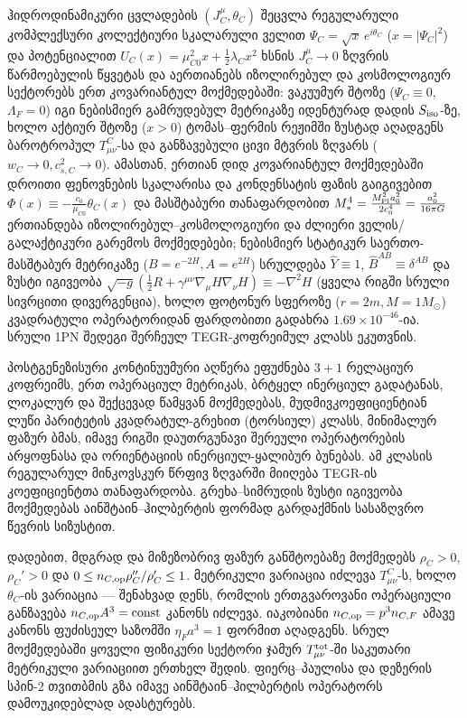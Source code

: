 \documentclass[11pt,a4paper]{article}
\begin{document}
\begin{enumerate}[label=\arabic*.]
ჰიდროდინამიკური ცვლადების $(J_C^\mu, \theta_C)$ შეცვლა რეგულარული კომპლექსური კოლექტიური სკალარული ველით $\Psi_C = \sqrt{x}\,e^{i\theta_C}$ ($x=|\Psi_C|^2$) და პოტენციალით $U_C(x) = \mu_{C0}^2 x + \frac{1}{2}\lambda_C x^2$ ხსნის $J_C^\mu \to 0$ ზღვრის წარმოებულის წყვეტას და აერთიანებს იზოლირებულ და კოსმოლოგიურ სექტორებს ერთ კოვარიანტულ მოქმედებაში: ვაკუუმურ შტოზე ($\Psi_C \equiv 0$, $\Lambda_F = 0$) იგი ნებისმიერ გამრუდებულ მეტრიკაზე იდენტურად დადის $S_{\rm iso}$-ზე, ხოლო აქტიურ შტოზე ($x > 0$) ტომას–ფერმის რეჟიმში ზუსტად აღადგენს ბაროტროპულ $T^C_{\mu\nu}$-სა და განზავებული ცივი მტვრის ზღვარს ($w_C \to 0, c_{s,C}^2 \to 0$). ამასთან, ერთიან დიდ კოვარიანტულ მოქმედებაში დროითი ფენოვნების სკალარისა და კონდენსატის ფაზის გაიგივებით $\Phi(x) \equiv -\frac{c_0}{\mu_{C0}}\theta_C(x)$ და მასშტაბური თანაფარდობით $M_*^4 = \frac{M_{\rm Pl}^2 a_0^2}{2 c_0^4} = \frac{a_0^2}{16\pi G}$ ერთიანდება იზოლირებულ–კოსმოლოგიური და ძლიერი ველის/გალაქტიკური გარემოს მოქმედებები; ნებისმიერ სტატიკურ საერთო-მასშტაბურ მეტრიკაზე ($B=e^{-2H}, A=e^{2H}$) სრულდება $\widehat{Y}\equiv 1$, $\widehat{B}^{AB}\equiv\delta^{AB}$ და ზუსტი იგივეობა $\sqrt{-g}(\frac{1}{2}R + \gamma^{\mu\nu}\nabla_\mu H\nabla_\nu H) \equiv -\nabla^2 H$ (ყველა რიგში სრული სივრცითი დივერგენცია), ხოლო ფოტონურ სფეროზე ($r=2m, M=1 M_\odot$) კვადრატული ოპერატორიდან ფარდობითი გადახრა $1.69\times 10^{-46}$-ია. სრული 1PN შედეგი შერჩეულ TEGR-კოფრეიმულ კლასს ეკუთვნის.

პოსტგენეზისური კონტინუუმური აღწერა ეფუძნება $3+1$ რელაციურ კოფრეიმს, ერთ ოპერაციულ მეტრიკას, ბრტყელ ინერციულ გადატანას, ლოკალურ და შექცევად წამყვან მოქმედებას, მუდმივკოეფიციენტიან ლუწი პარიტეტის კვადრატულ-გრეხით (ტორსიულ) კლასს, მინიმალურ ფაზურ ბმას, იმავე რიგში დაუთრგუნავი შერეული ოპერატორების არყოფნასა და ორიენტაციის ინერციულ-ყალიბურ ბუნებას. ამ კლასის რეგულარულ მინკოვსკურ წრფივ ზღვარში მიიღება TEGR-ის კოეფიციენტთა თანაფარდობა. გრეხა–სიმრუდის ზუსტი იგივეობა მოქმედებას აინშტაინ–ჰილბერტის ფორმად გარდაქმნის სასაზღვრო წევრის სიზუსტით.

დადებით, მდგრად და მიზეზობრივ ფაზურ განშტოებაზე მოქმედებს $\rho_C>0$, $\rho_C'>0$ და $0\le n_{C,{\rm op}}\rho_C''/\rho_C'\le1$. მეტრიკული ვარიაცია იძლევა $T^C_{\mu\nu}$-ს, ხოლო $\theta_C$-ის ვარიაცია — შენახვად დენს, რომლის ერთგვაროვანი ოპერაციული განზავება $n_{C,{\rm op}}A^3=\mathrm{const}$ კანონს იძლევა. იაკობიანი $n_{C,{\rm op}}=p^3n_{C,F}$ ამავე კანონს ფუძისეულ საზომში $\eta_Fa^3=1$ ფორმით აღადგენს. სრულ მოქმედებაში ყოველი ფიზიკური სექტორი ჯამურ $T^{\rm tot}_{\mu\nu}$-ში საკუთარი მეტრიკული ვარიაციით ერთხელ შედის. ფიერც–პაულისა და დეზერის სპინ-2 თვითბმის გზა იმავე აინშტაინ–ჰილბერტის ოპერატორს დამოუკიდებლად ადასტურებს.


\end{enumerate}
\end{document}
